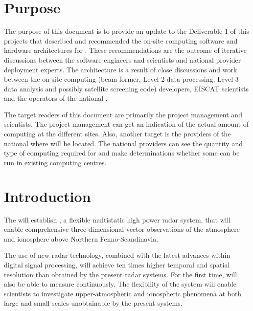 \documentclass[12pt,a4paper]{article}
\begin{document}
\section{Purpose}
\label{purpose}
The purpose of this document is to provide an update to the  Deliverable 1 of this projects that described and recommended the on-site computing software and hardware architectures for \ED. 
These recommendations are the outcome of iterative discussions between the \ED software engineers and scientists and national provider deployment experts. 
The architecture is a result of close discussions and work between the on-site computing (beam former, Level 2 data processing, Level 3 data analysis and possibly satellite screening code) developers, EISCAT scientists and the operators of the national \einfras.

The target readers of this document are primarily the \ED project management and scientists.
The \ED project management can get an indication of the actual amount of computing at the different \ED sites.
Also, another target is the providers of the national \einfras where \ED will be located.
The national \einfra providers can see the quantity and type of computing required for \ED and make determinations whether some can be run in existing computing centres.

\section{Introduction}
\label{intro}
The \ESA will establish \ED, a flexible multistatic high power radar system, that
will enable comprehensive three-dimensional vector observations of the atmosphere
and ionosphere above Northern Fenno-Scandinavia.  

The use of new radar technology, combined with the latest advances within digital signal processing,
will achieve ten times higher temporal and spatial resolution than
obtained by the present \EC radar systems. For the first time, \EC will also be able to measure continuously.  
The flexibility of the \ED system will enable scientists to investigate upper-atmospheric and 
ionospheric phenomena at both large and small scales unobtainable by the present systems.
\end{document}
